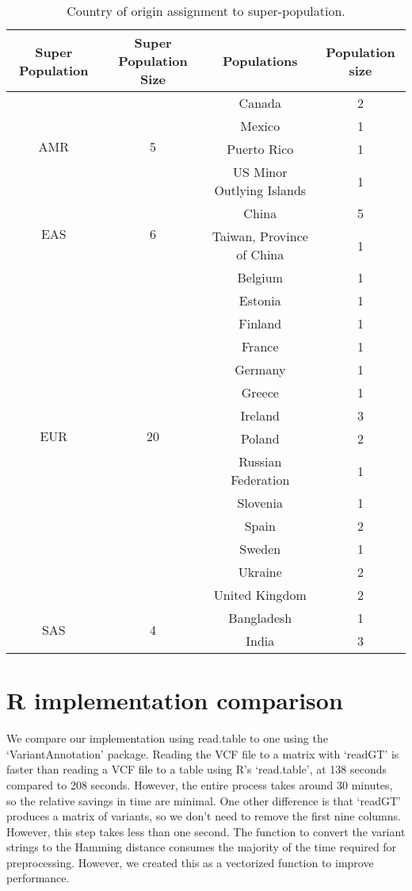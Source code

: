 \documentclass{bmcart}
\begin{document}
\label{pgppops}
\begin{table}[h!]
\caption{Country of origin assignment to super-population.}
      \begin{tabular}{|c|c|c|c|}
\hline
Super Population		&	Super Population Size &	Populations	&	Population size \\
\hline
\multirow{4}{*}{AMR} 	&	\multirow{4}{*}{5}	&	Canada	&	2	\\
					&					&	Mexico	&	1	\\
					&					&	Puerto Rico               & 1               \\
					&					&	US Minor Outlying Islands & 1               \\
					\hline
\multirow{2}{*}{EAS}		&	\multirow{2}{*}{6}	&	China                     & 5               \\
					&					&	Taiwan, Province of China & 1	\\
					\hline
\multirow{14}{*}{EUR}	&	\multirow{14}{*}{20}	& Belgium				& 1	\\
					&					& Estonia				& 1	\\
					&					& Finland				& 1	\\
					&					& France				& 1	\\
					&					& Germany			& 1	\\
					&					& Greece				& 1	\\
					&					& Ireland				& 3	\\
					&					& Poland				& 2	\\
					&					& Russian Federation	& 1	\\
					&					& Slovenia			& 1	\\
					&					& Spain				& 2	\\
					&					& Sweden				& 1	\\
					&					& Ukraine				& 2	\\
					&					& United Kingdom		& 2	\\
					\hline
\multirow{2}{*}{SAS}		&	\multirow{2}{*}{4}	& Bangladesh			& 1	\\
					&					& India				& 3        \\     
					\hline
      \end{tabular}
\end{table}

\newpage

\section{R implementation comparison}

We compare our implementation using {\sc read.table} to one using the `VariantAnnotation' package. Reading the VCF file to a matrix with `readGT' is faster than reading a VCF file to a
table using R's `read.table', at 138 seconds compared to 208 seconds. However, the entire process takes around 30 minutes, so the relative savings in time are minimal.
One other difference is that `readGT' produces a matrix of variants, so we don't need to remove the first nine columns. However, this step takes less than one second.
The function to convert the variant strings to the Hamming distance consumes the majority of the time required for preprocessing. However, we created this as a vectorized function to
improve performance. 
\end{document}
